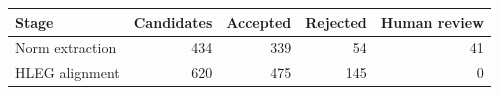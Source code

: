 \begin{tabular}{lrrrr}
\toprule
Stage & Candidates & Accepted & Rejected & Human review \\
\midrule
Norm extraction & 434 & 339 & 54 & 41 \\
HLEG alignment & 620 & 475 & 145 & 0 \\
\bottomrule
\end{tabular}
